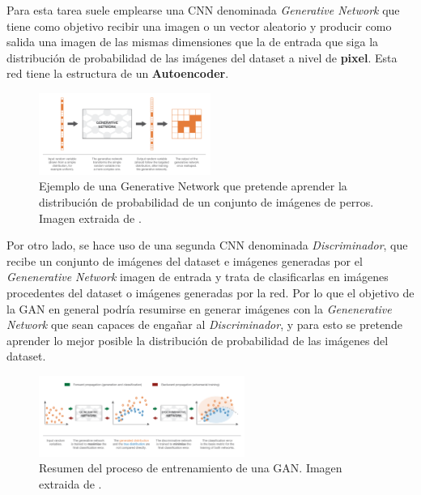             \medskip

            \noindent Para esta tarea suele emplearse una CNN denominada \textit{Generative Network} que tiene como objetivo recibir una imagen o un vector aleatorio y producir como salida una imagen de las mismas dimensiones que la de entrada que siga la distribución de probabilidad de las imágenes del dataset a nivel de \textbf{pixel}. Esta red tiene la estructura de un \textbf{Autoencoder}.

            \begin{figure}[!h]
                \centering
                \includegraphics[width=0.5\textwidth]{img/Generative_network.png}
                \caption{Ejemplo de una Generative Network que pretende aprender la distribución de probabilidad de un conjunto de imágenes de perros. Imagen extraida de \cite{autoencoders2017}.}
                \label{fig:Generative Network}
            \end{figure}
            
            \medskip

            \noindent Por otro lado, se hace uso de una segunda CNN denominada \textit{Discriminador}, que recibe un conjunto de imágenes del dataset e imágenes generadas por el \textit{Genenerative Network} imagen de entrada y trata de clasificarlas en imágenes procedentes del dataset o imágenes generadas por la red. Por lo que el objetivo de la GAN en general podría resumirse en generar imágenes con la \textit{Genenerative Network} que sean capaces de engañar al \textit{Discriminador}, y para esto se pretende aprender lo mejor posible la distribución de probabilidad de las imágenes del dataset.

            \begin{figure}[!h]
                \centering
                \includegraphics[width=0.6\textwidth]{img/proceso_entrenamiento_GAN.png}
                \caption{Resumen del proceso de entrenamiento de una GAN. Imagen extraida de \cite{autoencoders2017}.}
                \label{fig:Generative Network}
            \end{figure}

